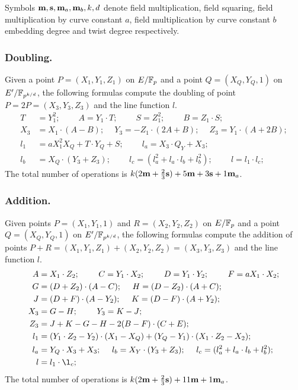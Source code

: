 Symbols $\textbf{m}, \textbf{s}, \textbf{m}_{a}, \textbf{m}_{b}, k, d$ denote
field multiplication,
field squaring,
field multiplication by curve constant $a$,
field multiplication by curve constant $b$
embedding degree and
twist degree respectively.

\subsubsection{Doubling.}
Given a point $P = (X_1,Y_1,Z_1)$ on $E/\mathbb{F}_{p}$ and a point $Q = (X_Q,Y_Q,1)$ on $E'/\mathbb{F}_{p^{k/d}}$,
the following formulas compute the doubling of point $P = 2P = (X_3,Y_3,Z_3)$ and the line function $l$.
\begin{align*}
T &= Y_1^2;\	\qquad	A = Y_1 \cdot T;\	\qquad
S = Z_1 ^ 2;\	\qquad	B = Z_1 \cdot S;\\
X_3 &= X_1 \cdot (A - B);\	\quad
Y_3 = -Z_1 \cdot (2A + B);\	\quad
Z_3 = Y_1 \cdot (A + 2B);\\
l_1 &= a X_1^2 X_Q + T \cdot Y_Q + S;\	\qquad
l_a = X_3 \cdot Q_Y + X_3;	\\
l_b &= X_Q \cdot (Y_3 + Z_3);\			\qquad
l_c = (l_a^2 + l_a \cdot l_b + l_b^2);\		\qquad
l = l_1 \cdot l_c;
\end{align*}
The total number of operations is
$ k(2\textbf{m} + \frac{2}{3}\textbf{s}) + 5\textbf{m} +3\textbf{s} + 1\textbf{m}_a$.

\subsubsection{Addition.}
Given points $P = (X_1,Y_1,1)$ and $R = (X_2,Y_2,Z_2)$ on $E/\mathbb{F}_{p}$ and a point $Q = (X_Q,Y_Q,1)$ on $E'/\mathbb{F}_{p^{k/d}}$,
the following formulas compute the addition of points $P + R = (X_1,Y_1,Z_1) + (X_2,Y_2,Z_2) = (X_3,Y_3,Z_3)$ and the line function $l$.
\begin{align*}
A &= X_1 \cdot Z_2;\	\qquad
C = Y_1 \cdot X_2;\	\qquad
D = Y_1 \cdot Y_2;\	\qquad
F = a X_1 \cdot X_2;\\
G &= (D + Z_2) \cdot (A - C);\	\quad
H = (D - Z_2) \cdot (A + C);\\
J &= (D + F) \cdot (A - Y_2);\	\quad
K = (D - F) \cdot (A + Y_2);\\
X_3 &= G - H;\	\qquad
Y_3 = K - J;\\
Z_3 &= J + K - G - H - 2(B - F) \cdot (C + E);\\
l_1 &= (Y_1 \cdot Z_2 - Y_2) \cdot (X_1 - X_Q) + (Y_Q - Y_1) \cdot (X_1 \cdot Z_2 - X_2);\\
l_a &= Y_Q \cdot X_3 + X_3;\	\quad
l_b = X_Y \cdot (Y_3 + Z_3);\	\quad
l_c = (l_a^2 + l_a \cdot l_b + l_b^2);\\
l &= l_1 \cdot \l_c;
\end{align*}
The total number of operations is
$ k(2\textbf{m} + \frac{2}{3}\textbf{s}) + 11\textbf{m} + 1\textbf{m}_a$.


